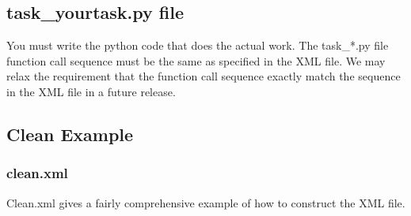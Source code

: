 \subsection{task\_yourtask.py file}

You must write the python code that does the actual work. The task\_*.py file function call sequence must be
the same as specified in the XML file. We may relax the requirement that the function call sequence exactly match 
the sequence in the XML file in a future release.

\subsection{Clean Example}
\subsubsection{clean.xml}
Clean.xml gives a fairly comprehensive example of how to construct the XML file.
